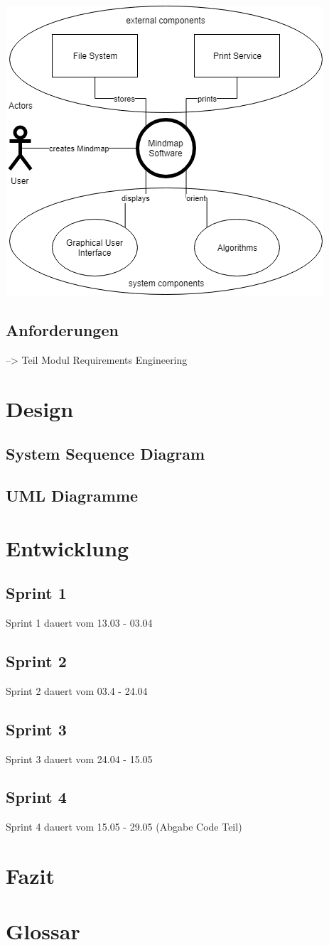 \documentclass[a4paper,parskip]{scrartcl}
\begin{document}
\includegraphics[width=0.5\linewidth]{Systemkontext.png}

\subsection{Anforderungen}
--> Teil Modul Requirements Engineering

\section{Design}

\subsection{System Sequence Diagram}

\subsection{UML Diagramme}

\section{Entwicklung}
\subsection{Sprint 1}
Sprint 1 dauert vom 13.03 - 03.04
\subsection{Sprint 2}
Sprint 2 dauert vom 03.4 - 24.04
\subsection{Sprint 3}
Sprint 3 dauert vom 24.04 - 15.05
\subsection{Sprint 4}
Sprint 4 dauert vom 15.05 - 29.05 (Abgabe Code Teil)
\section{Fazit}

\section{Glossar}
\end{document}
